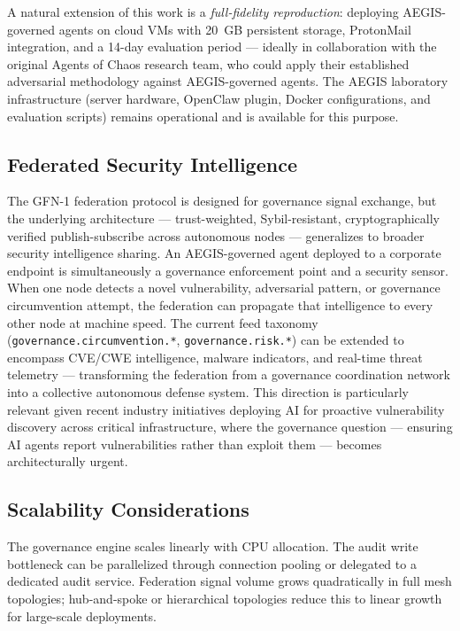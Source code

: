 \documentclass[journal]{IEEEtran}
\begin{document}
A natural extension of this work is a \textit{full-fidelity reproduction}: deploying AEGIS-governed agents on cloud VMs with 20~GB persistent storage, ProtonMail integration, and a 14-day evaluation period --- ideally in collaboration with the original Agents of Chaos research team, who could apply their established adversarial methodology against AEGIS-governed agents. The AEGIS laboratory infrastructure (server hardware, OpenClaw plugin, Docker configurations, and evaluation scripts) remains operational and is available for this purpose.

\subsection{Federated Security Intelligence}

The GFN-1 federation protocol is designed for governance signal exchange, but the underlying architecture --- trust-weighted, Sybil-resistant, cryptographically verified publish-subscribe across autonomous nodes --- generalizes to broader security intelligence sharing. An AEGIS-governed agent deployed to a corporate endpoint is simultaneously a governance enforcement point and a security sensor. When one node detects a novel vulnerability, adversarial pattern, or governance circumvention attempt, the federation can propagate that intelligence to every other node at machine speed. The current feed taxonomy (\texttt{governance.circumvention.*}, \texttt{governance.risk.*}) can be extended to encompass CVE/CWE intelligence, malware indicators, and real-time threat telemetry --- transforming the federation from a governance coordination network into a collective autonomous defense system. This direction is particularly relevant given recent industry initiatives deploying AI for proactive vulnerability discovery across critical infrastructure, where the governance question --- ensuring AI agents report vulnerabilities rather than exploit them --- becomes architecturally urgent.

\subsection{Scalability Considerations}

The governance engine scales linearly with CPU allocation. The audit write bottleneck can be parallelized through connection pooling or delegated to a dedicated audit service. Federation signal volume grows quadratically in full mesh topologies; hub-and-spoke or hierarchical topologies reduce this to linear growth for large-scale deployments.
\end{document}
